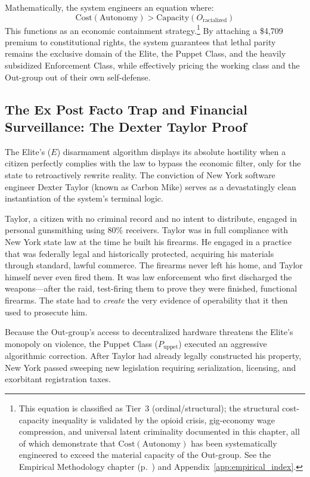 Mathematically, the system engineers an equation where:
\begin{equation}\label{eq:10.3-cannibalization-equation}
\text{Cost}(\text{Autonomy}) > \text{Capacity}(O_{\text{racialized}})
\end{equation}
This functions as an economic containment strategy.\footnote{This equation is classified as Tier~3 (ordinal/structural); the structural cost-capacity inequality is validated by the opioid crisis, gig-economy wage compression, and universal latent criminality documented in this chapter, all of which demonstrate that $\text{Cost}(\text{Autonomy})$ has been systematically engineered to exceed the material capacity of the Out-group. See the Empirical Methodology chapter (p.~\pageref{ch:empirical_methodology}) and Appendix~\ref{app:empirical_index}.} By attaching a \$4,709 premium to constitutional rights, the system guarantees that lethal parity remains the exclusive domain of the Elite, the Puppet Class, and the heavily subsidized Enforcement Class, while effectively pricing the working class and the Out-group out of their own self-defense.

\subsection{The Ex Post Facto Trap and Financial Surveillance: The Dexter Taylor Proof}
\label{sec:dexter_taylor}

The Elite's ($E$) disarmament algorithm displays its absolute hostility when a citizen perfectly complies with the law to bypass the economic filter, only for the state to retroactively rewrite reality. The conviction of New York software engineer Dexter Taylor (known as Carbon Mike) serves as a devastatingly clean instantiation of the system's terminal logic.

Taylor, a citizen with no criminal record and no intent to distribute, engaged in personal gunsmithing using 80\% receivers. Taylor was in full compliance with New York state law at the time he built his firearms. He engaged in a practice that was federally legal and historically protected, acquiring his materials through standard, lawful commerce. The firearms never left his home, and Taylor himself never even fired them. It was law enforcement who first discharged the weapons---after the raid, test-firing them to prove they were finished, functional firearms. The state had to \textit{create} the very evidence of operability that it then used to prosecute him.

Because the Out-group's access to decentralized hardware threatens the Elite's monopoly on violence, the Puppet Class ($P_{\text{uppet}}$) executed an aggressive algorithmic correction. After Taylor had already legally constructed his property, New York passed sweeping new legislation requiring serialization, licensing, and exorbitant registration taxes.

